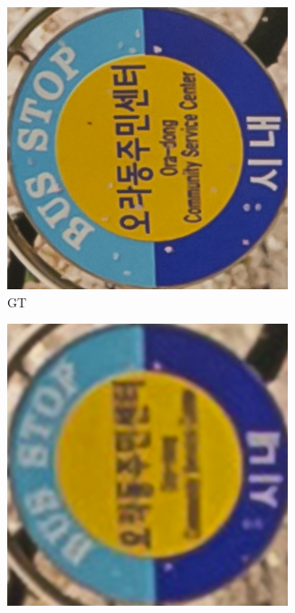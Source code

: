 \begin{figure}[htbp]
    \captionsetup[subfigure]{labelformat=empty} 
    \begin{subfigure}{0.3\textwidth}
        \includegraphics[width=\linewidth]{imgs/GT_Canon_020.png}
        \caption{GT} 
    \end{subfigure}
    \hfill
    \begin{subfigure}{0.3\textwidth}
        \includegraphics[width=\linewidth]{imgs/STESRGAN_23.65_0.7140_Canon_020.png}

\end{subfigure}
\end{figure}
